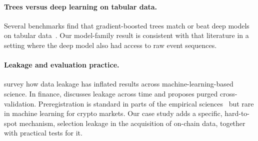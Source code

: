 \paragraph{Trees versus deep learning on tabular data.}
Several benchmarks find that gradient-boosted trees match or beat deep models on tabular data~\citep{grinsztajn2022tree,shwartzziv2022tabular,mcelfresh2023neural}. Our model-family result is consistent with that literature in a setting where the deep model also had access to raw event sequences.

\paragraph{Leakage and evaluation practice.}
\citet{kapoor2023leakage} survey how data leakage has inflated results across machine-learning-based science. In finance, \citet{lopezdeprado2018advances} discusses leakage across time and proposes purged cross-validation. Preregistration is standard in parts of the empirical sciences~\citep{nosek2018preregistration} but rare in machine learning for crypto markets. Our case study adds a specific, hard-to-spot mechanism, selection leakage in the acquisition of on-chain data, together with practical tests for it.
